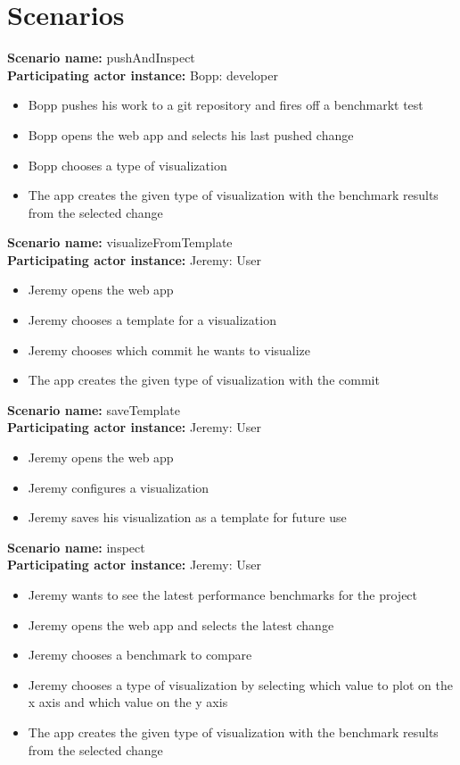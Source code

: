 \documentclass[parskip=full,11pt]{scrartcl}
\begin{document}
\pagebreak
\section{Scenarios}

\textbf{Scenario name:} pushAndInspect \\
\textbf{Participating actor instance:} Bopp: \gls{developer}
\begin{itemize}
	\item Bopp pushes his work to a git repository and fires off a benchmarkt test
	\item Bopp opens the web app and selects his last pushed change
	\item Bopp chooses a type of visualization
	\item The app creates the given type of visualization with the benchmark results from the selected change
\end{itemize}

\textbf{Scenario name:} visualizeFromTemplate \\
\textbf{Participating actor instance:} Jeremy: User
\begin{itemize}
	\item Jeremy opens the web app
	\item Jeremy chooses a template for a visualization
	\item Jeremy chooses which commit he wants to visualize
	\item The app creates the given type of visualization with the commit
\end{itemize}

\textbf{Scenario name:} saveTemplate \\
\textbf{Participating actor instance:} Jeremy: User
\begin{itemize}
	\item Jeremy opens the web app
	\item Jeremy configures a visualization
	\item Jeremy saves his visualization as a template for future use
\end{itemize}

\textbf{Scenario name:} inspect \\
\textbf{Participating actor instance:} Jeremy: User
\begin{itemize}
	\item Jeremy wants to see the latest performance benchmarks for the project
	\item Jeremy opens the web app and selects the latest change
	\item Jeremy chooses a benchmark to compare
	\item Jeremy chooses a type of visualization by selecting which value to plot on the x axis and which value on the y axis
	\item The app creates the given type of visualization with the benchmark results from the selected change
\end{itemize}
\end{document}
